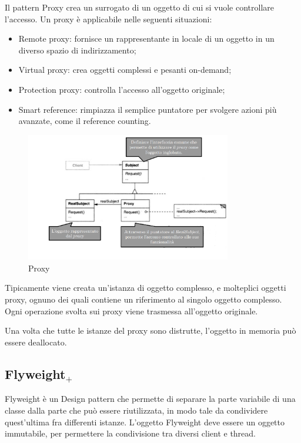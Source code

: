 Il pattern Proxy crea un surrogato di un oggetto di cui si vuole controllare l'accesso. Un proxy è applicabile nelle seguenti situazioni:
\begin{itemize}
\item Remote proxy: fornisce un rappresentante in locale di un oggetto in un diverso spazio di indirizzamento;
\item Virtual proxy: crea oggetti complessi e pesanti on-demand;
\item Protection proxy: controlla l'accesso all'oggetto originale;
\item Smart reference: rimpiazza il semplice puntatore per svolgere azioni più avanzate, come il reference counting.
\end{itemize}

\begin{figure}[H]
\includegraphics[width=0.8\textwidth]{res/img/DP/proxy}
\caption{Proxy}
\end{figure}

Tipicamente viene creata un'istanza di oggetto complesso, e molteplici oggetti proxy, ognuno dei quali contiene un riferimento al singolo oggetto complesso. 
Ogni operazione svolta sui proxy viene trasmessa all'oggetto originale. 

Una volta che tutte le istanze del proxy sono distrutte, l'oggetto in memoria può essere deallocato.

\subsection{Flyweight$_+$}
Flyweight è un Design pattern che permette di separare la parte variabile di una classe dalla parte che può essere riutilizzata, in modo tale da condividere quest'ultima fra differenti istanze. 
L'oggetto Flyweight deve essere un oggetto immutabile, per permettere la condivisione tra diversi client e thread.

